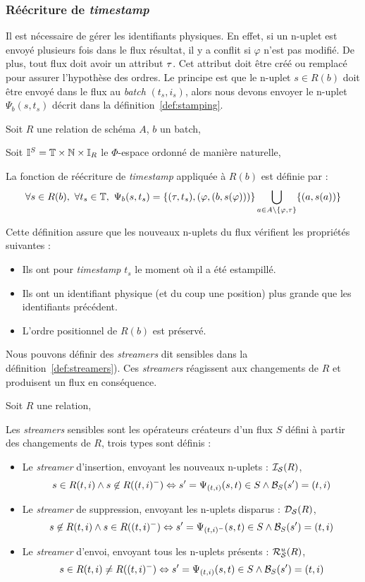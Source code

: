 \subsubsection{Réécriture de \textit{timestamp}}
Il est nécessaire de gérer les identifiants physiques. En effet, si un n-uplet est envoyé plusieurs fois dans le flux résultat, il y a conflit si $\varphi$ n'est pas modifié. De plus, tout flux doit avoir un attribut $\tau$. Cet attribut doit être créé ou remplacé pour assurer l'hypothèse des ordres. Le principe est que le n-uplet $s\in R(b)$ doit être envoyé dans le flux au \textit{batch} $(t_s,i_s)$, alors nous devons envoyer le n-uplet $\Psi_b(s,t_s)$ décrit dans la définition~\ref{def:stamping}.
\begin{defi}\label{def:stamping}
    Soit $R$ une relation de schéma $A$, $b$ un batch,

    Soit $\mathbb{I}^S = \mathbb{T}\times\mathbb{N}\times \mathbb{I}_R$ le $\Phi$-espace ordonné de manière naturelle,

    La fonction de réécriture de \textit{timestamp} appliquée à $R(b)$ est définie par : 
$$\forall s\in R(b), \ \forall t_s\in\T, \ \Psi_b(s,t_s) = \{(\t,t_s), (\varphi, (b,s(\varphi)))\}\bigcup_{a\in A\backslash\{\varphi,\t\}}\{(a,s(a))\}$$
\end{defi}

Cette définition assure que les nouveaux n-uplets du flux vérifient les propriétés suivantes : 
\begin{itemize}
 \item Ils ont pour \textit{timestamp} $t_s$ le moment où il a été estampillé.
 \item Ils ont un identifiant physique (et du coup une position) plus grande que les identifiants précédent.
 \item L'ordre positionnel de $R(b)$ est préservé.
\end{itemize}
Nous pouvons définir des \textit{streamers} dit sensibles dans la définition~\ref{def:streamers}). Ces \textit{streamers} réagissent aux changements de $R$ et produisent un flux en conséquence.
\begin{defi}\label{def:streamers}
    Soit $R$ une relation,

    Les \textit{streamers} sensibles sont les opérateurs créateurs d'un flux $S$ défini à partir des changements de $R$, trois types sont définis :
\begin{itemize}
 \item Le \textit{streamer} d'insertion, envoyant les nouveaux n-uplets : $\mathcal{I_S}(R)$, $$s\in R(t,i) \wedge s\not\in R((t,i)^-) \Leftrightarrow s'=\Psi_{(t,i)}(s,t)\in S \wedge \mathcal{B}_S(s') = (t,i)$$
 \item Le \textit{streamer} de suppression, envoyant les n-uplets disparus : $\mathcal{D_S}(R)$, $$s\not\in R(t,i) \wedge s\in R((t,i)^-) \Leftrightarrow s'=\Psi_{(t,i)^-}(s,t)\in S \wedge \mathcal{B}_S(s') = (t,i)$$
 \item Le \textit{streamer} d'envoi, envoyant tous les n-uplets présents : $\mathcal{R}_{\mathcal S}^{u}(R)$, $$s\in R(t,i) \neq R((t,i)^-) \Leftrightarrow s'=\Psi_{(t,i)}(s,t)\in S \wedge \mathcal{B}_S(s') = (t,i)$$
\end{itemize}
\end{defi}


